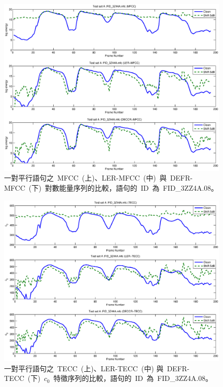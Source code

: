 \begin{figure}[!htb]
\centering
\includegraphics[width=1.0\textwidth]{figs/testutt_mfcc}
\caption{一對平行語句之~MFCC~(上)、LER-MFCC~(中)~與~DEFR-MFCC~(下)~對數能量序列的比較，語句的~ID~為~{\sffamily FID\_3ZZ4A.08}。} 
\label{fig:testutt_mfcc}
\end{figure}

\begin{figure}[!htb]
\centering
\includegraphics[width=1.0\textwidth]{figs/testutt}
\caption{一對平行語句之~TECC~(上)、LER-TECC~(中) 與~DEFR-TECC~(下)~$c_0$~特徵序列的比較，語句的~ID~為~{\sffamily FID\_3ZZ4A.08}。} 
\label{fig:testutt}
\end{figure}


